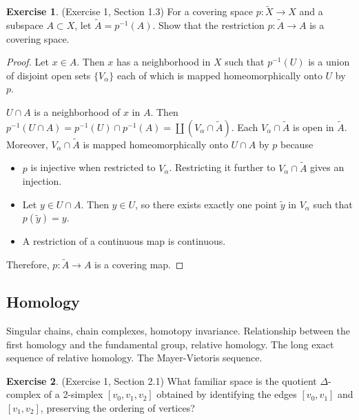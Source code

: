 \documentclass[12pt, psamsfonts]{amsart}
\theoremstyle{definition}
\newtheorem*{exer}{Exercise}
\theoremstyle{remark}
\numberwithin{equation}{section}
\begin{document}
\begin{exer}{(Exercise 1, Section 1.3)}
  For a covering space $p: \tilde{X} \rightarrow X$ and a subspace $A \subset X$, let $\tilde{A} = p^{-1}(A)$.
  Show that the restriction $p: \tilde{A} \rightarrow A$ is a covering space.
\end{exer}

\begin{proof}
  Let $x \in A$.
  Then $x$ has a neighborhood in $X$ such that $p^{-1}(U)$ is a union of disjoint open sets $\{ V_{\alpha} \}$ each of which is mapped homeomorphically onto $U$ by $p$.

  $U \cap A$ is a neighborhood of $x$ in $A$.
  Then $p^{-1}(U \cap A) = p^{-1}(U) \cap p^{-1}(A) = \coprod (V_{\alpha} \cap \tilde{A})$.
  Each $V_{\alpha} \cap \tilde{A}$ is open in $\tilde{A}$.
  Moreover, $V_{\alpha} \cap \tilde{A}$ is mapped homeomorphically onto $U \cap A$ by $p$ because
  \begin{itemize}
    \item
      $p$ is injective when restricted to $V_{\alpha}$.
      Restricting it further to $V_{\alpha} \cap \tilde{A}$ gives an injection.
    \item
      Let $y \in U \cap A$.
      Then $y \in U$, so there exists exactly one point $\tilde{y}$ in $V_{\alpha}$ such that $p(\tilde{y}) = y$.
    \item
      A restriction of a continuous map is continuous.
  \end{itemize}
  Therefore, $p:\tilde{A} \rightarrow A$ is a covering map.
\end{proof}

\subsection{Homology}
Singular chains, chain complexes, homotopy invariance.
Relationship between the first homology and the fundamental group, relative homology.
The long exact sequence of relative homology.
The Mayer-Vietoris sequence.

\begin{exer}{(Exercise 1, Section 2.1)}
  What familiar space is the quotient $\Delta$-complex of a 2-simplex $[v_0, v_1, v_2]$ obtained by identifying the edges $[v_0, v_1]$ and $[v_1, v_2]$, preserving the ordering of vertices?
\end{exer}
\end{document}
